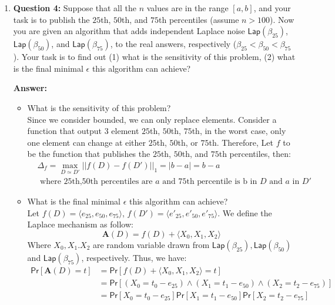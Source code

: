 \documentclass{article}
\renewcommand{\AA}{\mathbf{A}}
\renewcommand{\Pr}[1]{\ensuremath{\mathsf{Pr}\left[#1\right]}\xspace}
\newcommand{\ans}[1]{\begin{mdframed}\textbf{Answer: }#1\end{mdframed}}
\begin{document}
\begin{enumerate}
{	}
	\item []\textbf{Question 4:} Suppose that all the $n$ values are in the range $[a,b]$, and your task is to publish the $25$th, $50$th, and $75$th percentiles (assume $n>100$).  Now you are given an algorithm that adds independent Laplace noise $\mathsf{Lap}\left(\beta_{25}\right)$, $\mathsf{Lap}\left(\beta_{50}\right)$, and $\mathsf{Lap}\left(\beta_{75}\right)$, to the real answers, respectively ($\beta_{25}<\beta_{50}<\beta_{75}$).  Your task is to find out (1) what is the sensitivity of this problem, (2) what is the final minimal $\epsilon$ this algorithm can achieve? 
	\ans{
		\begin{itemize}
			\item What is the sensitivity of this problem?
			\\
			Since we consider bounded, we can only replace elements. Consider a function that output 3 element $25$th, $50$th, $75$th, in the worst case, only one element can change at either $25$th, $50$th, or $75$th. Therefore, Let $f$ to be the function that publishes the $25$th, $50$th, and $75$th percentiles, then:
			\begin{equation}
			\begin{split}
				&\Delta_f = \max_{D\simeq D'} ||f(D) - f(D')||_1 = |b-a| = b-a 
				\\&\text{ where 25th,50th percentiles are }a\text{ and 75th percentile is b in }D\text{ and } a \text{ in } D'
			\end{split}
			\end{equation}
			\item What is the final minimal $\epsilon$ this algorithm can achieve?
			\\
			Let $f(D)=\langle e_{25},e_{50},e_{75} \rangle$, $f(D')=\langle e'_{25},e'_{50},e'_{75} \rangle$. We define the Laplace mechanism as follow:
			\begin{equation}
				\AA(D) = f(D) + \langle X_0,X_1,X_2\rangle
			\end{equation}
			Where $X_0,X_1.X_2$ are random variable drawn from $\mathsf{Lap}(\beta_{25}),\mathsf{Lap}(\beta_{50})$ and $\mathsf{Lap}(\beta_{75})$, respectively.
			Thus, we have:
			\begin{equation}
				\begin{split}
					\Pr{\AA(D) = t} &=\Pr{f(D)+\langle X_0,X_1,X_2\rangle = t} 
					\\&= \Pr{(X_0=t_0-e_{25})\wedge (X_1=t_1-e_{50})\wedge (X_2 = t_2-e_{75})}
					\\&= \Pr{X_0=t_0-e_{25}}\Pr{X_1=t_1-e_{50}}\Pr{X_2 = t_2-e_{75}}

\end{split}
\end{equation}
\end{itemize}}
\end{enumerate}
\end{document}

